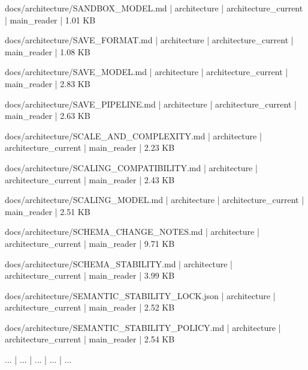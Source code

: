 \documentclass[11pt,a4paper]{report}
\begin{document}
{\small\ttfamily\raggedright docs/\allowbreak{}architecture/\allowbreak{}SANDBOX\_MODEL.\allowbreak{}md | architecture | architecture\_current | main\_reader | 1.\allowbreak{}01 KB\par}
{\small\ttfamily\raggedright docs/\allowbreak{}architecture/\allowbreak{}SAVE\_FORMAT.\allowbreak{}md | architecture | architecture\_current | main\_reader | 1.\allowbreak{}08 KB\par}
{\small\ttfamily\raggedright docs/\allowbreak{}architecture/\allowbreak{}SAVE\_MODEL.\allowbreak{}md | architecture | architecture\_current | main\_reader | 2.\allowbreak{}83 KB\par}
{\small\ttfamily\raggedright docs/\allowbreak{}architecture/\allowbreak{}SAVE\_PIPELINE.\allowbreak{}md | architecture | architecture\_current | main\_reader | 2.\allowbreak{}63 KB\par}
{\small\ttfamily\raggedright docs/\allowbreak{}architecture/\allowbreak{}SCALE\_AND\_COMPLEXITY.\allowbreak{}md | architecture | architecture\_current | main\_reader | 2.\allowbreak{}23 KB\par}
{\small\ttfamily\raggedright docs/\allowbreak{}architecture/\allowbreak{}SCALING\_COMPATIBILITY.\allowbreak{}md | architecture | architecture\_current | main\_reader | 2.\allowbreak{}43 KB\par}
{\small\ttfamily\raggedright docs/\allowbreak{}architecture/\allowbreak{}SCALING\_MODEL.\allowbreak{}md | architecture | architecture\_current | main\_reader | 2.\allowbreak{}51 KB\par}
{\small\ttfamily\raggedright docs/\allowbreak{}architecture/\allowbreak{}SCHEMA\_CHANGE\_NOTES.\allowbreak{}md | architecture | architecture\_current | main\_reader | 9.\allowbreak{}71 KB\par}
{\small\ttfamily\raggedright docs/\allowbreak{}architecture/\allowbreak{}SCHEMA\_STABILITY.\allowbreak{}md | architecture | architecture\_current | main\_reader | 3.\allowbreak{}99 KB\par}
{\small\ttfamily\raggedright docs/\allowbreak{}architecture/\allowbreak{}SEMANTIC\_STABILITY\_LOCK.\allowbreak{}json | architecture | architecture\_current | main\_reader | 2.\allowbreak{}52 KB\par}
{\small\ttfamily\raggedright docs/\allowbreak{}architecture/\allowbreak{}SEMANTIC\_STABILITY\_POLICY.\allowbreak{}md | architecture | architecture\_current | main\_reader | 2.\allowbreak{}54 KB\par}
{\small\ttfamily\raggedright .\allowbreak{}.\allowbreak{}.\allowbreak{} | .\allowbreak{}.\allowbreak{}.\allowbreak{} | .\allowbreak{}.\allowbreak{}.\allowbreak{} | .\allowbreak{}.\allowbreak{}.\allowbreak{} | .\allowbreak{}.\allowbreak{}.\allowbreak{}\par}
\end{document}

